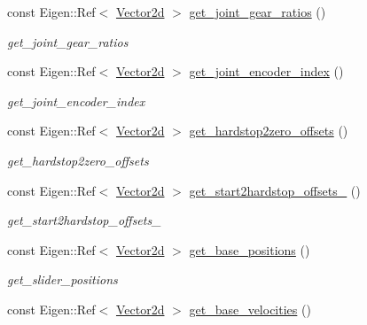 \begin{DoxyCompactItemize}
const Eigen\+::\+Ref$<$ \hyperlink{common__header_8hpp_acb6916bc8c9fe9d98c484fd4cc201447}{Vector2d} $>$ \hyperlink{classblmc__robots_1_1Stuggihop_ae693c1a57f25426d82cece8d5066d331}{get\+\_\+joint\+\_\+gear\+\_\+ratios} ()
\begin{DoxyCompactList}\small\item\em get\+\_\+joint\+\_\+gear\+\_\+ratios \end{DoxyCompactList}\item 
const Eigen\+::\+Ref$<$ \hyperlink{common__header_8hpp_acb6916bc8c9fe9d98c484fd4cc201447}{Vector2d} $>$ \hyperlink{classblmc__robots_1_1Stuggihop_afc0dfd7c91f9a83126ed6644ae29ed20}{get\+\_\+joint\+\_\+encoder\+\_\+index} ()
\begin{DoxyCompactList}\small\item\em get\+\_\+joint\+\_\+encoder\+\_\+index \end{DoxyCompactList}\item 
const Eigen\+::\+Ref$<$ \hyperlink{common__header_8hpp_acb6916bc8c9fe9d98c484fd4cc201447}{Vector2d} $>$ \hyperlink{classblmc__robots_1_1Stuggihop_a0669e1c16bd6698966149cebad9c43fc}{get\+\_\+hardstop2zero\+\_\+offsets} ()
\begin{DoxyCompactList}\small\item\em get\+\_\+hardstop2zero\+\_\+offsets \end{DoxyCompactList}\item 
const Eigen\+::\+Ref$<$ \hyperlink{common__header_8hpp_acb6916bc8c9fe9d98c484fd4cc201447}{Vector2d} $>$ \hyperlink{classblmc__robots_1_1Stuggihop_a206157411d7bd41d5d599106512482ae}{get\+\_\+start2hardstop\+\_\+offsets\+\_\+} ()
\begin{DoxyCompactList}\small\item\em get\+\_\+start2hardstop\+\_\+offsets\+\_\+ \end{DoxyCompactList}\item 
const Eigen\+::\+Ref$<$ \hyperlink{common__header_8hpp_acb6916bc8c9fe9d98c484fd4cc201447}{Vector2d} $>$ \hyperlink{classblmc__robots_1_1Stuggihop_a6da73065d935420daf4959b8f912128c}{get\+\_\+base\+\_\+positions} ()
\begin{DoxyCompactList}\small\item\em get\+\_\+slider\+\_\+positions \end{DoxyCompactList}\item 
const Eigen\+::\+Ref$<$ \hyperlink{common__header_8hpp_acb6916bc8c9fe9d98c484fd4cc201447}{Vector2d} $>$ \hyperlink{classblmc__robots_1_1Stuggihop_a7f869117918d0d5d5813d29222430d88}{get\+\_\+base\+\_\+velocities} ()

\end{DoxyCompactItemize}
